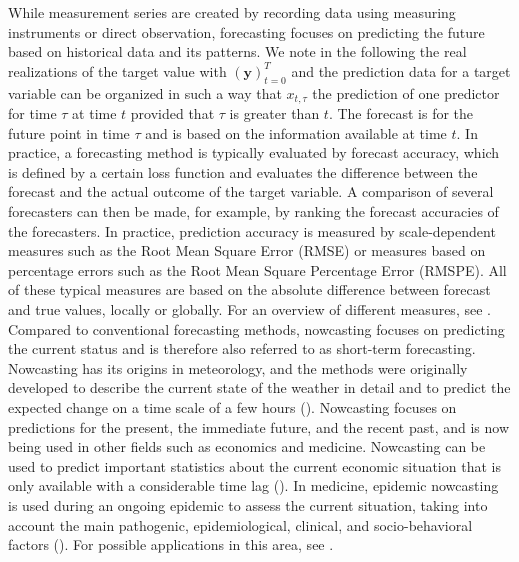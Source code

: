 While measurement series are created by recording data using measuring instruments or direct observation, forecasting focuses on predicting the future based on historical data and its patterns. We note in the following the real realizations of the target value with $(\mathbf{y})^T_{t=0}$  and the prediction data for a target variable can be organized in such a way that $x_{t,\tau}$  the prediction of one predictor for time $\tau$ at time $t$ provided that $\tau$ is greater than $t$. The forecast is for the future point in time $\tau$ and is based on the information available at time $t$. 
In practice, a forecasting method is typically evaluated by forecast accuracy, which is defined by a certain loss function and evaluates the difference between the forecast and the actual outcome of the target variable.
A comparison of several forecasters can then be made, for example, by ranking the forecast accuracies of the forecasters.
In practice, prediction accuracy is measured by scale-dependent measures such as the Root Mean Square Error (RMSE) or measures based on percentage errors such as the Root Mean Square Percentage Error (RMSPE). All of these typical measures are based on the absolute difference between forecast and true values, locally or globally. For an overview of different measures, see \cite{hyndman2006another}. 
Compared  to conventional forecasting methods, nowcasting focuses on predicting the current status and is therefore also referred to as short-term forecasting.  Nowcasting has its origins in meteorology, and the methods were originally developed to describe the current state of the weather in detail and to predict the expected change on a time scale of a few hours (\cite{browning1989nowcasting,schmid2019nowcasting}).
Nowcasting focuses on predictions for the present, the immediate future, and the recent past, and is now being used in other fields such as economics and medicine. Nowcasting can be used to predict important statistics about the current economic situation that is only available with a considerable time lag (\cite{banbura2013now, giannone2006nowcasting,fornaro2020nowcasting,bok2018macroeconomic}). In medicine, epidemic nowcasting is used during an ongoing epidemic to assess the current situation, taking into account the main pathogenic, epidemiological, clinical, and socio-behavioral factors (\cite{wu2021nowcasting}). For possible applications in this area, see \cite{johansson2014nowcasting,gunther2021nowcasting,birrell2021real}.
